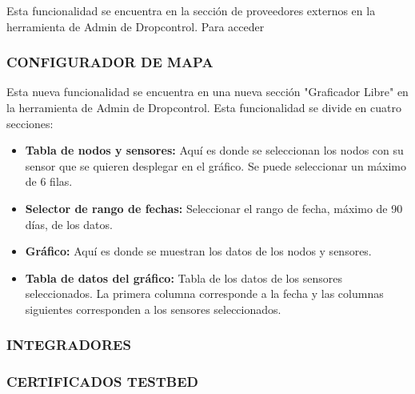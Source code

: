 Esta funcionalidad se encuentra en la sección de proveedores externos en la herramienta de Admin de Dropcontrol. Para acceder 

\subsubsection{CONFIGURADOR DE MAPA}

Esta nueva funcionalidad se encuentra en una nueva sección "Graficador Libre" en la herramienta de Admin de Dropcontrol. Esta funcionalidad se divide en cuatro secciones:
\begin{itemize}
    \item \textbf{Tabla de nodos y sensores:} Aquí es donde se seleccionan los nodos con su sensor que se quieren desplegar en el gráfico. Se puede seleccionar un máximo de 6 filas. 
    \item \textbf{Selector de rango de fechas:} Seleccionar el rango de fecha, máximo de 90 días, de los datos.
    \item \textbf{Gráfico:} Aquí es donde se muestran los datos de los nodos y sensores.
    \item \textbf{Tabla de datos del gráfico:} Tabla de los datos de los sensores seleccionados. La primera columna corresponde a la fecha y las columnas siguientes corresponden a los sensores seleccionados.
\end{itemize}

\subsubsection{INTEGRADORES}

\subsubsection{CERTIFICADOS TESTBED}